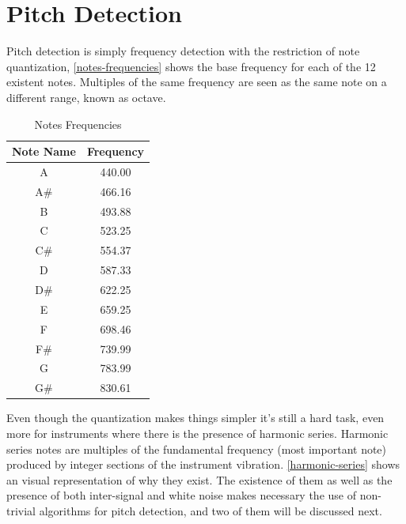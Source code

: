 \section{Pitch Detection}
\label{pitch-detection}

Pitch detection is simply frequency detection with the restriction of note quantization,
\autoref{notes-frequencies} shows the base frequency for each of the 12 existent
notes. Multiples of the same frequency are seen as the same note on a different
range, known as octave.
\begin{table}[htb]
  \begin{center}
    \ABNTEXreducedfont
    \caption[Notes Frequencies]{Notes Frequencies}
    \label{notes-frequencies}
    \begin{tabular}{c|c}
      \hline
      Note Name & Frequency\\
      \hline \hline
      A & 440.00 \\
      A\# & 466.16 \\
      B & 493.88 \\
      C & 523.25 \\
      C\# & 554.37 \\
      D & 587.33 \\
      D\# & 622.25 \\
      E & 659.25 \\
      F & 698.46 \\
      F\# & 739.99 \\
      G & 783.99 \\
      G\# & 830.61 \\
      \hline
    \end{tabular}
  \end{center}
\end{table}
Even though the quantization makes things simpler it's still a hard task, even
more for instruments where there is the presence of harmonic series. Harmonic
series notes are multiples of the fundamental frequency (most important
note) produced by integer sections of the instrument vibration. \autoref{harmonic-series}
shows an visual representation of why they exist. The existence of them as well
as the presence of both inter-signal and white noise makes necessary the use of
non-trivial algorithms for pitch detection, and two of them will be discussed next.
